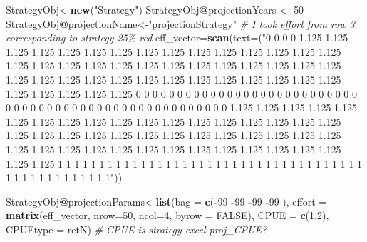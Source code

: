 \documentclass[
]{book}
\newenvironment{Shaded}{\begin{snugshade}}{\end{snugshade}}
\newcommand{\AttributeTok}[1]{\textcolor[rgb]{0.13,0.29,0.53}{#1}}
\newcommand{\CommentTok}[1]{\textcolor[rgb]{0.56,0.35,0.01}{\textit{#1}}}
\newcommand{\ConstantTok}[1]{\textcolor[rgb]{0.56,0.35,0.01}{#1}}
\newcommand{\DecValTok}[1]{\textcolor[rgb]{0.00,0.00,0.81}{#1}}
\newcommand{\FunctionTok}[1]{\textcolor[rgb]{0.13,0.29,0.53}{\textbf{#1}}}
\newcommand{\NormalTok}[1]{#1}
\newcommand{\OtherTok}[1]{\textcolor[rgb]{0.56,0.35,0.01}{#1}}
\newcommand{\SpecialCharTok}[1]{\textcolor[rgb]{0.81,0.36,0.00}{\textbf{#1}}}
\newcommand{\StringTok}[1]{\textcolor[rgb]{0.31,0.60,0.02}{#1}}
\begin{document}
\begin{Shaded}
\begin{Highlighting}[]
\NormalTok{StrategyObj}\OtherTok{\textless{}{-}}\FunctionTok{new}\NormalTok{(}\StringTok{"Strategy"}\NormalTok{)}
\NormalTok{StrategyObj}\SpecialCharTok{@}\NormalTok{projectionYears }\OtherTok{\textless{}{-}} \DecValTok{50}
\NormalTok{StrategyObj}\SpecialCharTok{@}\NormalTok{projectionName}\OtherTok{\textless{}{-}}\StringTok{"projectionStrategy"}
\CommentTok{\# I took effort from row 3 corresponding to strategy 25\% red}
\NormalTok{eff\_vector}\OtherTok{=}\FunctionTok{scan}\NormalTok{(}\AttributeTok{text=}\NormalTok{(}\StringTok{"0    0   0   0   1.125   1.125   1.125   1.125   1.125   1.125   1.125   1.125   1.125   1.125   1.125   1.125   1.125   1.125   1.125   1.125   1.125   1.125   1.125   1.125   1.125   1.125   1.125   1.125   1.125   1.125   1.125   1.125   1.125   1.125   1.125   1.125   1.125   1.125   1.125   1.125   1.125   1.125   1.125   1.125   1.125   1.125   1.125   1.125   1.125   1.125   0   0   0   0   0   0   0   0   0   0   0   0   0   0   0   0   0   0   0   0   0   0   0   0   0   0   0   0   0   0   0   0   0   0   0   0   0   0   0   0   0   0   0   0   0   0   0   0   0   0   0   0   0   0   1.125   1.125   1.125   1.125   1.125   1.125   1.125   1.125   1.125   1.125   1.125   1.125   1.125   1.125   1.125   1.125   1.125   1.125   1.125   1.125   1.125   1.125   1.125   1.125   1.125   1.125   1.125   1.125   1.125   1.125   1.125   1.125   1.125   1.125   1.125   1.125   1.125   1.125   1.125   1.125   1.125   1.125   1.125   1.125   1.125   1.125   1   1   1   1   1   1   1   1   1   1   1   1   1   1   1   1   1   1   1   1   1   1   1   1   1   1   1   1   1   1   1   1   1   1   1   1   1   1   1   1   1   1   1   1   1   1   1   1   1   1"}\NormalTok{))}

\NormalTok{StrategyObj}\SpecialCharTok{@}\NormalTok{projectionParams}\OtherTok{\textless{}{-}}\FunctionTok{list}\NormalTok{(}\AttributeTok{bag =} \FunctionTok{c}\NormalTok{(}\SpecialCharTok{{-}}\DecValTok{99}  \SpecialCharTok{{-}}\DecValTok{99} \SpecialCharTok{{-}}\DecValTok{99} \SpecialCharTok{{-}}\DecValTok{99}
\NormalTok{), }\AttributeTok{effort =} \FunctionTok{matrix}\NormalTok{(eff\_vector, }\AttributeTok{nrow=}\DecValTok{50}\NormalTok{, }\AttributeTok{ncol=}\DecValTok{4}\NormalTok{, }\AttributeTok{byrow =} \ConstantTok{FALSE}\NormalTok{), }\AttributeTok{CPUE =} \FunctionTok{c}\NormalTok{(}\DecValTok{1}\NormalTok{,}\DecValTok{2}\NormalTok{), }\AttributeTok{CPUEtype =} \StringTok{\textquotesingle{}retN\textquotesingle{}}\NormalTok{) }\CommentTok{\# CPUE is strategy excel proj\_CPUE?}
\end{Highlighting}
\end{Shaded}
\end{document}
